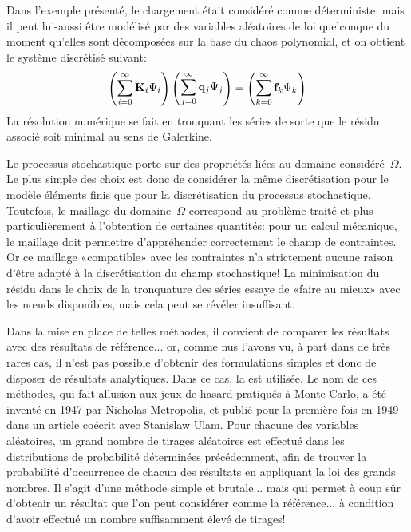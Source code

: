 \medskip
Dans l'exemple présenté, le chargement était considéré comme déterministe, mais il peut lui-aussi être modélisé par des variables aléatoires de loi quelconque du moment qu'elles sont décomposées sur la base du chaos polynomial, et on obtient le système discrétisé suivant:
\begin{equation}
\PP{\dsum_{i=0}^\infty \MM{K}_i\Psi_i}\PP{\dsum_{j=0}^\infty \VV{q}_j\Psi_j}=\PP{\dsum_{k=0}^\infty \VV{f}_k\Psi_k}
\end{equation}
La résolution numérique se fait en tronquant les séries de sorte que le résidu associé soit minimal au sens de Galerkine.

\medskip
Le processus stochastique porte sur des propriétés liées au domaine considéré~$\Omega$.
Le plus simple des choix est donc de considérer la même discrétisation pour le modèle éléments finis que pour la discrétisation du processus stochastique.
Toutefois, le maillage du domaine~$\Omega$ correspond au problème traité et plus particulièrement à l'obtention de certaines quantités: pour un calcul mécanique, le maillage doit permettre d'appréhender correctement le champ de contraintes.
Or ce maillage «compatible» avec les contraintes n'a strictement aucune raison d'être adapté à la discrétisation du champ stochastique!
La minimisation du résidu dans le choix de la tronquature des séries essaye de «faire au mieux» avec les nœuds disponibles, mais cela peut se révéler insuffisant.

\medskip
Dans la mise en place de telles méthodes, il convient de comparer les résultats avec des résultats de référence... or, comme nus l'avons vu, à part dans de très rares cas, il n'est pas possible d'obtenir des formulations simples et donc de disposer de résultats analytiques.
Dans ce cas, la  est utilisée. Le nom de ces méthodes, qui fait allusion aux jeux de hasard pratiqués à Monte-Carlo, a été inventé en 1947 par Nicholas Metropolis, et publié pour la première fois en 1949 dans un article coécrit avec Stanislaw Ulam. Pour chacune des variables aléatoires, un grand nombre de tirages aléatoires est effectué dans les distributions de probabilité déterminées précédemment, afin de trouver la probabilité d'occurrence de chacun des résultats en appliquant la loi des grands nombres. Il s'agit d'une méthode simple et brutale... mais qui permet à coup sûr d'obtenir un résultat que l'on peut considérer comme la référence... à condition d'avoir effectué un nombre suffisamment élevé de tirages!


